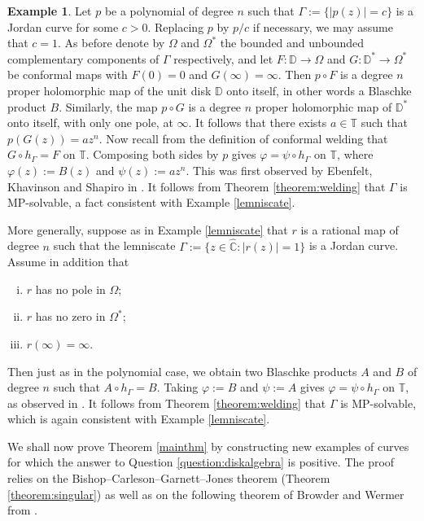 \documentclass{amsart}
\theoremstyle{plain}
\theoremstyle{definition}
\newtheorem{example}{Example}[section]
\theoremstyle{remark}
\newcommand{\mD}{\mathbb{D}}
\newcommand{\mT}{\mathbb{T}}
\newcommand{\hC}{\widehat{\mathbb{C}}}
\begin{document}
\begin{example}
\label{ex:lemniscates}
Let $p$ be a polynomial of degree $n$ such that $\Gamma:=\{|p(z)|=c\}$ is a Jordan curve for some $c>0$. Replacing $p$ by $p/c$ if necessary, we may assume that $c=1$. As before denote by $\Omega$ and $\Omega^*$ the bounded and unbounded complementary components of $\Gamma$ respectively, and let $F:\mD \to \Omega$ and $G:\mD^* \to \Omega^*$ be conformal maps with $F(0)=0$ and $G(\infty)=\infty$. Then $p \circ F$ is a degree $n$ proper holomorphic map of the unit disk $\mD$ onto itself, in other words a Blaschke product $B$. Similarly, the map $p \circ G$ is a degree $n$ proper holomorphic map of $\mD^*$ onto itself, with only one pole, at $\infty$. It follows that there exists $a \in \mT$ such that $p(G(z))=az^n$. Now recall from the definition of conformal welding that $G \circ h_\Gamma=F$ on $\mT$. Composing both sides by $p$ gives $\varphi = \psi \circ h_\Gamma$ on $\mT$, where $\varphi(z):=B(z)$ and $\psi(z):=az^n$. This was first observed by Ebenfelt, Khavinson and Shapiro in \cite[Theorem 2.2]{EbenfeltKhavinsonShapiro2011}. It follows from Theorem \ref{theorem:welding} that $\Gamma$ is MP-solvable, a fact consistent with Example \ref{lemniscate}.

More generally, suppose as in Example \ref{lemniscate} that $r$ is a rational map of degree $n$ such that the lemniscate $\Gamma:=\{z \in \hC:|r(z)|=1\}$ is a Jordan curve. Assume in addition that
\begin{enumerate}[(i)]
\item $r$ has no pole in $\Omega$;
\item $r$ has no zero in $\Omega^*$;
\item $r(\infty)=\infty.$
\end{enumerate}
Then just as in the polynomial case, we obtain two Blaschke products $A$ and $B$ of degree $n$ such that $A \circ h_\Gamma=B$. Taking $\varphi:=B$ and $\psi:=A$ gives $\varphi = \psi \circ h_\Gamma$ on $\mT$, as observed in \cite[Theorem 3.2]{Younsi2016}. It follows from Theorem \ref{theorem:welding} that $\Gamma$ is MP-solvable, which is again consistent with Example \ref{lemniscate}.
\end{example}


We shall now prove Theorem \ref{mainthm} by constructing new examples of curves for which the answer to Question \ref{question:diskalgebra} is positive. The proof relies on the Bishop--Carleson--Garnett--Jones theorem (Theorem \ref{theorem:singular}) as well as on the following theorem of Browder and Wermer from \cite[Theorem 2]{BrowderWermer1964}.
\end{document}
